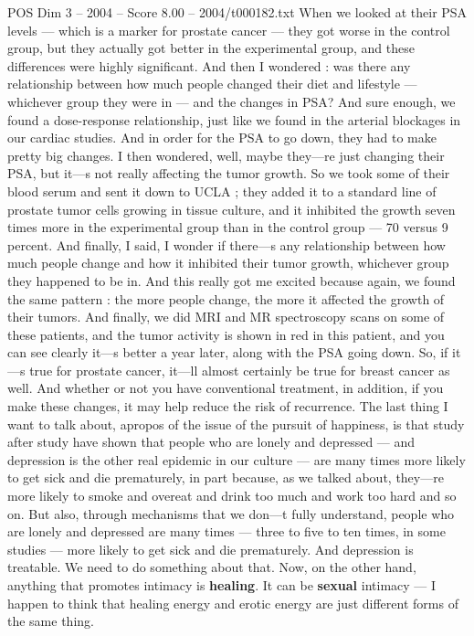 \begin{textsample}{POS Dim 3 – 2004 – Score 8.00 – 2004/t000182.txt}
When we looked at their PSA levels — which is a marker for prostate cancer — they got worse in the control group, but they actually got better in the experimental group, and these differences were highly significant.
And then I wondered : was there any relationship between how much people changed their diet and lifestyle — whichever group they were in — and the changes in PSA?
And sure enough, we found a dose-response relationship, just like we found in the arterial blockages in our cardiac studies.
And in order for the PSA to go down, they had to make pretty big changes.
I then wondered, well, maybe they—re just changing their PSA, but it—s not really affecting the tumor growth.
So we took some of their blood serum and sent it down to UCLA ; they added it to a standard line of prostate tumor cells growing in tissue culture, and it inhibited the growth seven times more in the experimental group than in the control group — 70 versus 9 percent.
And finally, I said, I wonder if there—s any relationship between how much people change and how it inhibited their tumor growth, whichever group they happened to be in.
And this really got me excited because again, we found the same pattern : the more people change, the more it affected the growth of their tumors.
And finally, we did MRI and MR spectroscopy scans on some of these patients, and the tumor activity is shown in red in this patient, and you can see clearly it—s better a year later, along with the PSA going down.
So, if it—s true for prostate cancer, it—ll almost certainly be true for breast cancer as well.
And whether or not you have conventional treatment, in addition, if you make these changes, it may help reduce the risk of recurrence.
The last thing I want to talk about, apropos of the issue of the pursuit of happiness, is that study after study have shown that people who are lonely and depressed — and depression is the other real epidemic in our culture — are many times more likely to get sick and die prematurely, in part because, as we talked about, they—re more likely to smoke and overeat and drink too much and work too hard and so on.
But also, through mechanisms that we don—t fully understand, people who are lonely and depressed are many times — three to five to ten times, in some studies — more likely to get sick and die prematurely.
And depression is treatable.
We need to do something about that.
Now, on the other hand, anything that promotes intimacy is \textbf{healing}.
It can be \textbf{sexual} intimacy — I happen to think that healing energy and erotic energy are just different forms of the same thing.

\end{textsample}
